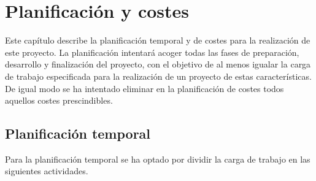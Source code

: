 \documentclass[a4paper,11pt]{book}
\begin{document}
\chapter{Planificación y costes}
Este capítulo describe la planificación temporal y de costes para la realización de este proyecto. La planificación intentará acoger todas las fases de preparación, desarrollo y finalización del proyecto, con el objetivo de al menos igualar la carga de trabajo especificada para la realización de un proyecto de estas características. De igual modo se ha intentado eliminar en la planificación de costes todos aquellos costes prescindibles.

\section{Planificación temporal}

Para la planificación temporal se ha optado por dividir la carga de trabajo en las siguientes actividades.
\end{document}

